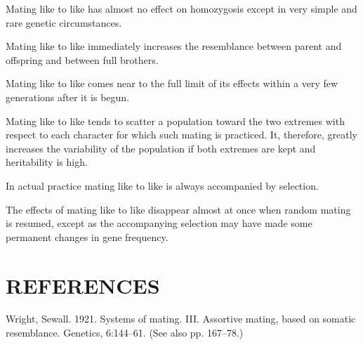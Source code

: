 Mating like to like has almost no effect on homozygosis except in
very simple and rare genetic circumstances.

Mating like to like immediately increases the resemblance between
parent and offspring and between full brothers.

Mating like to like comes near to the full limit of its effects within a
very few generations after it is begun.

Mating like to like tends to scatter a population toward the two
extremes with respect to each character for which such mating is practiced.
It, therefore, greatly increases the variability of the population if
both extremes are kept and heritability is high.

In actual practice mating like to like is always accompanied by
selection.

The effects of mating like to like disappear almost at once when random
mating is resumed, except as the accompanying selection may have
made some permanent changes in gene frequency.

\section*{REFERENCES}

\begin{hangparas}{0.5in}{1}%
Wright, Sewall. 1921. Systems of mating. {III}. Assortive mating, based on somatic
resemblance. Genetics, 6:144--61. (See also pp. 167--78.)
\end{hangparas}

